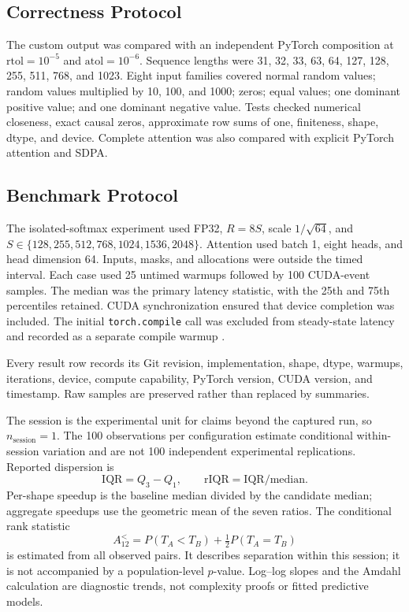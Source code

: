 \documentclass[twoside,twocolumn,10pt]{article}
\newcommand{\code}[1]{\texttt{#1}}
\begin{document}
\subsection{Correctness Protocol}

The custom output was compared with an independent PyTorch composition at
$\mathrm{rtol}=10^{-5}$ and $\mathrm{atol}=10^{-6}$. Sequence lengths were
31, 32, 33, 63, 64, 127, 128, 255, 511, 768, and 1023. Eight input families
covered normal random values; random values multiplied by 10, 100, and 1000;
zeros; equal values; one dominant positive value; and one dominant negative
value. Tests checked numerical closeness, exact causal zeros, approximate row
sums of one, finiteness, shape, dtype, and device. Complete attention was also
compared with explicit PyTorch attention and SDPA.

\subsection{Benchmark Protocol}

The isolated-softmax experiment used FP32, $R=8S$, scale $1/\sqrt{64}$, and
$S\in\{128,255,512,768,1024,1536,2048\}$. Attention used batch 1, eight
heads, and head dimension 64. Inputs, masks, and allocations were outside the
timed interval. Each case used 25 untimed warmups followed by 100 CUDA-event
samples. The median was the primary latency statistic, with the 25th and 75th
percentiles retained. CUDA synchronization ensured that device completion was
included. The initial \code{torch.compile} call was excluded from steady-state
latency and recorded as a separate compile warmup \cite{cuda_events,
pytorch_cuda_event,pytorch_cuda_synchronize,pytorch_compile}.

Every result row records its Git revision, implementation, shape, dtype,
warmups, iterations, device, compute capability, PyTorch version, CUDA version,
and timestamp. Raw samples are preserved rather than replaced by summaries.

The session is the experimental unit for claims beyond the captured run, so
$n_{\mathrm{session}}=1$. The 100 observations per configuration estimate
conditional within-session variation and are not 100 independent experimental
replications. Reported dispersion is
\begin{equation}
\mathrm{IQR}=Q_3-Q_1,\qquad
\mathrm{rIQR}=\mathrm{IQR}/\mathrm{median}.
\end{equation}
Per-shape speedup is the baseline median divided by the candidate median;
aggregate speedups use the geometric mean of the seven ratios. The conditional
rank statistic
\begin{equation}
A_{12}^{<}=P(T_A<T_B)+\tfrac{1}{2}P(T_A=T_B)
\end{equation}
is estimated from all observed pairs. It describes separation within this
session; it is not accompanied by a population-level $p$-value. Log--log slopes
and the Amdahl calculation are diagnostic trends, not complexity proofs or
fitted predictive models.
\end{document}

